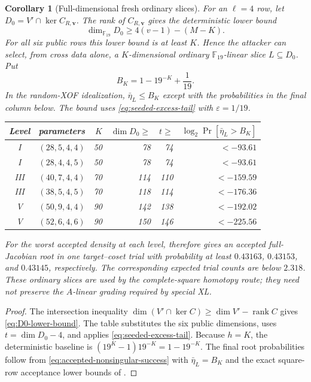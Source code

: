 \documentclass[11pt]{article}
\newtheorem{corollary}[corollary]{Corollary}
\newcommand{\F}{\mathbb F}
\newcommand{\rank}{\operatorname{rank}}
\begin{document}
\begin{corollary}[Full-dimensional fresh ordinary slices]
\label{cor:full-ordinary-slices}
For an $\ell=4$ row, let
$D_0=V'\cap\ker C_{R,\mathbf v}$.  The rank of $C_{R,\mathbf v}$ gives the
deterministic lower bound
\begin{equation}\label{eq:D0-lower-bound}
 \dim_{\F_{19}}D_0
 \ge 4(v-1)-(M-K).
\end{equation}
For all six public rows this lower bound is at least $K$.  Hence the attacker
can select, from cross data alone, a $K$-dimensional ordinary
$\F_{19}$-linear slice $L\subseteq D_0$.  Put
\[
 B_K=1-19^{-K}+\frac1{19}.
\]
In the random-XOF idealization,
$\bar\eta_L\le B_K$ except with the probabilities in the final column below.
The bound uses \eqref{eq:seeded-excess-tail} with $\varepsilon=1/19$.

\begin{center}
\small
\setlength{\tabcolsep}{3.6pt}
\begin{tabular}{@{}c l r r r r@{}}
\toprule
Level & parameters & $K$ & $\dim D_0\ge$ & $t\ge$ &
$\log_2\Pr[\bar\eta_L>B_K]$\\
\midrule
I   & $(28,5,4,4)$  & 50 & 78  & 74  & $<-93.61$\\
I   & $(28,4,4,5)$  & 50 & 78  & 74  & $<-93.61$\\
III & $(40,7,4,4)$  & 70 & 114 & 110 & $<-159.59$\\
III & $(38,5,4,5)$  & 70 & 118 & 114 & $<-176.36$\\
V   & $(50,9,4,4)$  & 90 & 142 & 138 & $<-192.02$\\
V   & $(52,6,4,6)$  & 90 & 150 & 146 & $<-225.56$\\
\bottomrule
\end{tabular}
\end{center}

For the worst accepted density at each level,
 therefore gives an accepted
full-Jacobian root in one target--coset trial with probability at least
$0.43163$, $0.43153$, and $0.43145$, respectively.  The corresponding
expected trial counts are below $2.318$.  These ordinary slices are used by the
complete-square homotopy route; they need not preserve the $A$-linear grading
required by special XL.
\end{corollary}

\begin{proof}
The intersection inequality
$\dim(V'\cap\ker C)\ge\dim V'-\rank C$ gives
\eqref{eq:D0-lower-bound}.  The table substitutes the six public dimensions,
uses $t=\dim D_0-4$, and applies \eqref{eq:seeded-excess-tail}.  Because
$h=K$, the deterministic baseline is
$(19^K-1)19^{-K}=1-19^{-K}$.  The final root probabilities follow from
\eqref{eq:accepted-nonsingular-success} with $\bar\eta_L=B_K$ and the exact
square-row acceptance lower bounds of .
\end{proof}
\end{document}
